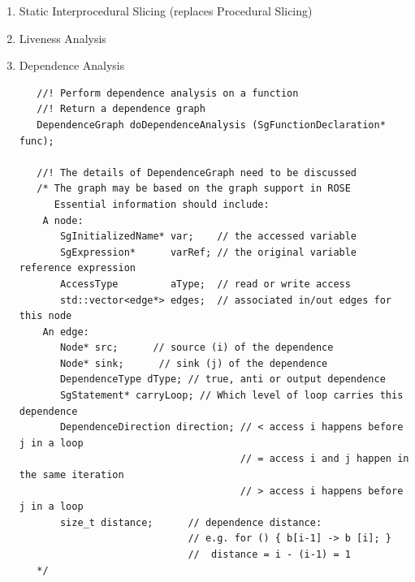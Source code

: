 \begin{enumerate}
\begin{enumerate}
      \item Static Interprocedural Slicing (replaces Procedural Slicing)
      \item Liveness Analysis
      \item Dependence Analysis
   \begin{lstlisting}
   //! Perform dependence analysis on a function
   //! Return a dependence graph
   DependenceGraph doDependenceAnalysis (SgFunctionDeclaration* func);

   //! The details of DependenceGraph need to be discussed
   /* The graph may be based on the graph support in ROSE
      Essential information should include:
    A node: 
       SgInitializedName* var;    // the accessed variable
       SgExpression*      varRef; // the original variable reference expression 
       AccessType         aType;  // read or write access
       std::vector<edge*> edges;  // associated in/out edges for this node
    An edge:
       Node* src;      // source (i) of the dependence
       Node* sink;      // sink (j) of the dependence
       DependenceType dType; // true, anti or output dependence
       SgStatement* carryLoop; // Which level of loop carries this dependence
       DependenceDirection direction; // < access i happens before j in a loop
                                      // = access i and j happen in the same iteration
                                      // > access i happens before j in a loop
       size_t distance;      // dependence distance: 
                             // e.g. for () { b[i-1] -> b [i]; } 
                             //  distance = i - (i-1) = 1
   */ 
   \end{lstlisting}

   \end{enumerate}

\end{enumerate}

